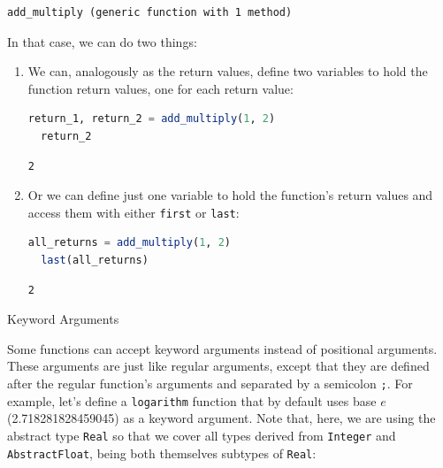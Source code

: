 \documentclass[
  notoc %
]{tufte-book}
\makeatletter
\newcommand{\passthrough}[1]{#1}
\renewcommand\subsubsection{%
\@startsection{subsubsection}{3}{\z@ }{-3.25ex\@plus -1ex \@minus -.2ex}{1.5ex \@plus .2ex}{\normalfont \normalsize \bfseries }
}
\makeatother
\begin{document}
\begin{lstlisting}[language=Output]
add_multiply (generic function with 1 method)
\end{lstlisting}

In that case, we can do two things:

\begin{enumerate}
\def\labelenumi{\arabic{enumi}.}
\item
  We can, analogously as the return values, define two variables to hold
  the function return values, one for each return value:

  \begin{lstlisting}[language=Julia]
  return_1, return_2 = add_multiply(1, 2)
  return_2
  \end{lstlisting}

  \begin{lstlisting}[language=Output]
  2
  \end{lstlisting}
\item
  Or we can define just one variable to hold the function's return
  values and access them with either \passthrough{\lstinline!first!} or
  \passthrough{\lstinline!last!}:

  \begin{lstlisting}[language=Julia]
  all_returns = add_multiply(1, 2)
  last(all_returns)
  \end{lstlisting}

  \begin{lstlisting}[language=Output]
  2
  \end{lstlisting}
\end{enumerate}

\hypertarget{sec:function_keyword_arguments}{%
\subsubsection{Keyword Arguments}\label{sec:function_keyword_arguments}}

Some functions can accept keyword arguments instead of positional
arguments. These arguments are just like regular arguments, except that
they are defined after the regular function's arguments and separated by
a semicolon \passthrough{\lstinline!;!}. For example, let's define a
\passthrough{\lstinline!logarithm!} function that by default uses base
\(e\) (2.718281828459045) as a keyword argument. Note that, here, we are
using the abstract type \passthrough{\lstinline!Real!} so that we cover
all types derived from \passthrough{\lstinline!Integer!} and
\passthrough{\lstinline!AbstractFloat!}, being both themselves subtypes
of \passthrough{\lstinline!Real!}:
\end{document}
